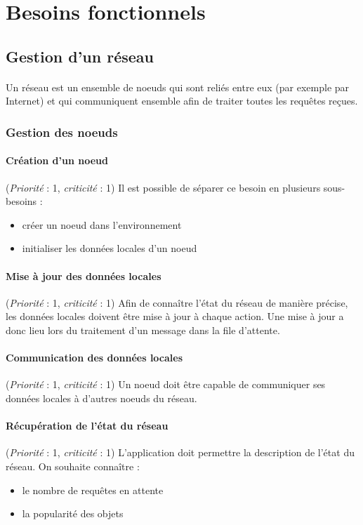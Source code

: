 \documentclass[12pt]{article}
\newcommand{\besoin}[2] {
  (\textit{Priorité} : #1, \textit{criticité} : #2)
}
\begin{document}
\newpage

\section{Besoins fonctionnels}

\subsection{Gestion d'un réseau}

\paragraph{} Un réseau est un ensemble de noeuds qui sont reliés entre eux (par exemple par Internet) et qui communiquent ensemble afin de traiter toutes les requêtes reçues.


\subsubsection{Gestion des noeuds}

\paragraph{Création d'un noeud} \besoin{1}{1} Il est possible de séparer ce besoin en plusieurs sous-besoins :
 \begin{itemize}
 	\item créer un noeud dans l'environnement
 	\item initialiser les données locales d'un noeud
 \end{itemize}

\paragraph{Mise à jour des données locales} \besoin{1}{1} Afin de connaître l'état du réseau de manière précise, les données locales doivent être mise à jour à chaque action. Une mise à jour a donc lieu lors du traitement d'un message dans la file d'attente.

\paragraph{Communication des données locales} \besoin{1}{1} Un noeud doit être capable de communiquer ses données locales à d'autres noeuds du réseau.

\paragraph{Récupération de l'état du réseau} \besoin{1}{1} L'application doit permettre la description de l'état du réseau.
On souhaite connaître : 
\begin{itemize}
 \item le nombre de requêtes en attente
 \item la popularité des objets
\end{itemize}
\end{document}
